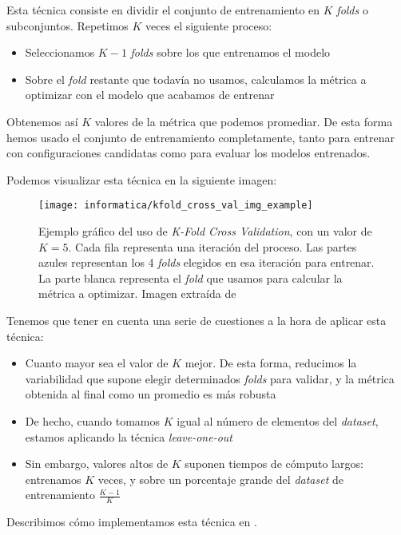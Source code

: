 Esta técnica consiste en dividir el conjunto de entrenamiento en $K$ \textit{folds} o subconjuntos. Repetimos $K$ veces el siguiente proceso:

\begin{itemize}
    \item Seleccionamos $K-1$ \textit{folds} sobre los que entrenamos el modelo
    \item Sobre el \textit{fold} restante que todavía no usamos, calculamos la métrica a optimizar con el modelo que acabamos de entrenar
\end{itemize}

Obtenemos así $K$ valores de la métrica que podemos promediar. De esta forma hemos usado el conjunto de entrenamiento completamente, tanto para entrenar con configuraciones candidatas como para evaluar los modelos entrenados.

Podemos visualizar esta técnica en la siguiente imagen:

\begin{figure}[H]
    \centering
    \texttt{[image: informatica/kfold\_cross\_val\_img\_example]}
    \caption{Ejemplo gráfico del uso de \textit{K-Fold Cross Validation}, con un valor de $K = 5$. Cada fila representa una iteración del proceso. Las partes azules representan los 4 \textit{folds} elegidos en esa iteración para entrenar. La parte blanca representa el \textit{fold} que usamos para calcular la métrica a optimizar. Imagen extraída de \cite{informatica:kfold_cross_val_img_web}}
\end{figure}

Tenemos que tener en cuenta una serie de cuestiones a la hora de aplicar esta técnica:

\begin{itemize}
    \item Cuanto mayor sea el valor de $K$ mejor. De esta forma, reducimos la variabilidad que supone elegir determinados \textit{folds} para validar, y la métrica obtenida al final como un promedio es más robusta
    \item De hecho, cuando tomamos $K$ igual al número de elementos del \textit{dataset}, estamos aplicando la técnica \textit{leave-one-out} \cite{informatica:kfold_cross_val_paper}
    \item Sin embargo, valores altos de $K$ suponen tiempos de cómputo largos: entrenamos $K$ veces, y sobre un porcentaje grande del \textit{dataset} de entrenamiento $\frac{K - 1}{K}$
\end{itemize}

Describimos cómo implementamos esta técnica en .
